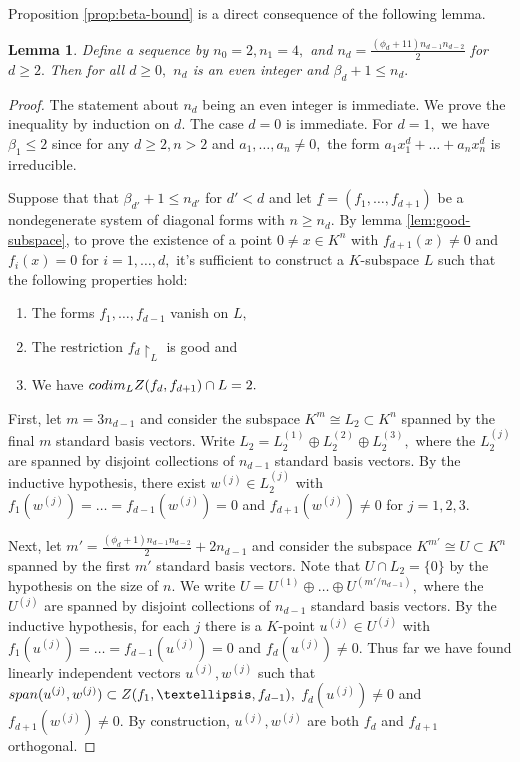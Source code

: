 \documentclass[10pt,a4paper]{amsart}
\let\ul\underline
\newtheorem{lemma}[theorem]{Lemma}
\theoremstyle{definition}
\renewcommand{\sp}{\textnormal{span}}
\newcommand{\codim}{\textnormal{codim}}
\begin{document}
    Proposition \ref{prop:beta-bound} is a direct consequence of the following lemma.

    \begin{lemma}\label{lem:beta-recursion}
        Define a sequence by $n_0 = 2,n_1 = 4,$ and 
        $n_d = \frac{(\phi_d+11)n_{d-1}n_{d-2}}{2} $ for $d\ge 2.$ Then for all $d\ge 0,$ $n_d$ is an even integer and $\beta_d+1 \le n_d.$
    \end{lemma}

    \begin{proof}
        The statement about $n_d$ being an even integer is immediate. We prove the inequality by induction on $d.$ The case $d=0$ is immediate. For $d=1,$ we have $\beta_1\le 2$ since for any $d\ge 2, n>2$ and $a_1,\ldots,a_n \neq 0,$ the form $a_1x_1^d+\ldots+a_nx_n^d$ is irreducible.
        
        Suppose that that $\beta_{d'}+1 \le n_{d'}$ for $d' < d$ and let $\ul{f} = (f_1,\ldots,f_{d+1})$ be a nondegenerate system of diagonal forms with $n \ge  n_d.$ By lemma \ref{lem:good-subspace}, to prove the existence of a point $0\neq x\in K^n$ with $f_{d+1}(x) \neq 0$ and $f_i(x) = 0$ for $i = 1,\ldots,d,$ it's sufficient to construct a  $K$-subspace $L$ such that the following properties hold:
        \begin{enumerate}
            \item The forms $f_1,\ldots,f_{d-1}$ vanish on $L,$
            \item The restriction $f_d\restriction_L$ is good and
            \item We have $\codim_L Z(f_d,f_{d+1})\cap L = 2.$
        \end{enumerate}

        First, let $m = 3n_{d-1}$ and consider the subspace $K^m\cong L_2\subset K^n$ spanned by the final $m$ standard basis vectors. Write $L_2 = L_2^{(1)}\oplus L_2^{(2)}\oplus L_2^{(3)},$ where the $L_2^{(j)}$ are spanned by disjoint collections of $n_{d-1}$ standard basis vectors. By the inductive hypothesis, there exist $w^{(j)}\in L_2^{(j)} $ with $f_1(w^{(j)}) = \ldots = f_{d-1}(w^{(j)}) = 0$ and $f_{d+1}(w^{(j)}) \neq 0$ for $j=1,2,3.$ 

        Next,  let $m' =\frac{(\phi_d+1)n_{d-1}n_{d-2}}{2} + 2n_{d-1}$ and consider the subspace $K^{m'}\cong U\subset K^n$ spanned by the first $m'$ standard basis vectors. Note that $U\cap L_2 = \{0\}$ by the hypothesis on the size of $n.$ We write $U = U^{(1)}\oplus\ldots\oplus U^{(m'/n_{d-1})},$ where the $U^{(j)}$ are spanned by disjoint collections of $n_{d-1}$ standard basis vectors. By the inductive hypothesis, for each $j$ there is a $K$-point $u^{(j)}\in U^{(j)} $ with $f_1(u^{(j)}) = \ldots = f_{d-1}(u^{(j)}) = 0$ and $f_d(u^{(j)}) \neq 0.$ Thus far we have found linearly independent vectors $u^{(j)},w^{(j)}$ such that $\sp(u^{(j)},w^{(j)}) \subset Z(f_1,\ldots,f_{d-1}),$ $f_d(u^{(j)}) \neq 0$ and $f_{d+1}(w^{(j)})\neq 0.$ By construction, $u^{(j)},w^{(j)}$ are both $f_d$ and $f_{d+1}$ orthogonal.


\end{proof}
\end{document}
